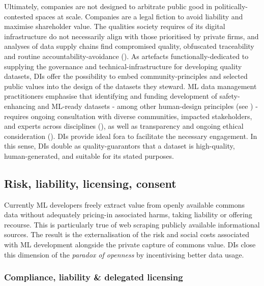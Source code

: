 Ultimately, companies are not designed to arbitrate public good in politically-contested spaces at scale. Companies are a legal fiction to avoid liability and maximise shareholder value. The qualities society requires of its digital infrastructure do not necessarily align with those prioritised by private firms, and analyses of data supply chains find compromised quality, obfuscated traceability and routine accountability-avoidance (\cite{longpre2023DataProvenanceInitiative}). As  artefacts functionally-dedicated to supplying the governance and technical-infrastructure for developing quality datasets, DIs offer the possibility to embed community-principles and selected public values into the design of the datasets they steward. ML data management practitioners emphasise that identifying and funding development of safety-enhancing and ML-ready datasets - among other human-design principles (see \textcite{bai2022TrainingHelpfulHarmless}) - requires ongoing consultation with diverse communities, impacted stakeholders, and experts across disciplines (\cite{aragon2022HumanCenteredDataScience}), as well as transparency and ongoing ethical consideration (\cite{jo2020LessonsArchivesStrategies}). DIs provide ideal fora to facilitate the necessary engagement. In this sense, DIs double as quality-guarantors that a dataset is high-quality, human-generated, and suitable for its stated purposes.

\subsection*{Risk, liability, licensing, consent}

Currently ML developers freely extract value from openly available commons data without adequately pricing-in associated harms, taking liability or offering recourse. This is particularly true of web scraping publicly available informational sources. The result is the externalisation of the risk and social costs associated with ML development alongside the private capture of commons value. DIs close this dimension of the \textit{paradox of openness} by incentivising better data usage. 

\subsubsection*{Compliance, liability \& delegated licensing}

